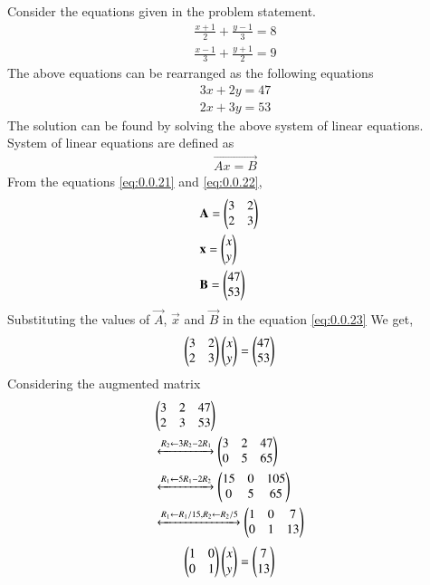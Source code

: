 \documentclass[journal,12pt,twocolumn]{IEEEtran}
\begin{document}
\solution Consider the equations given in the problem statement.
\begin{align}
\displaystyle\frac{x+1}{2}+\displaystyle\frac{y-1}{3}=8\\
\displaystyle\frac{x-1}{3}+\displaystyle\frac{y+1}{2}=9
\end{align}
The above equations can be rearranged as the following equations
\begin{align}
3x+2y=47 \label{eq:0.0.21}\\
2x+3y=53 \label{eq:0.0.22}
\end{align}
The solution can be found by solving the above system of linear equations.\\ 
System of linear equations are defined as 
\begin{align}
\vec{Ax=B} \label{eq:0.0.23}
\end{align}
From the equations \eqref{eq:0.0.21} and \eqref{eq:0.0.22}, 
\begin{align}
&\vec{A}= \myvec{3 &2\\2 & 3}&\\
\medskip
&\vec{x}= \myvec{ x\\ y}&\\
\medskip
&\vec{B}= \myvec{47\\53}&  
\end{align} 
Substituting the values of $\vec{A}$, $\vec{x}$ and $\vec{B}$ in the equation \eqref{eq:0.0.23}
We get,
\begin{align}
&\begin{pmatrix}3&2\\2&3\end{pmatrix} \begin{pmatrix}x\\y\end{pmatrix}= \begin{pmatrix}47\\53\end{pmatrix}&
\end{align}
Considering the augmented matrix 
 \begin{align}
& \begin{pmatrix}3&2&47\\2&3&53\end{pmatrix}&
 \\
&\xleftrightarrow[]{ R_2 \leftarrow 3R_2 - 2R_1}
 \begin{pmatrix}3&2&47\\0&5&65\end{pmatrix}&\\
 &\xleftrightarrow[]{ R_1 \leftarrow 5R_1 - 2R_2}
 \begin{pmatrix}15&0&105\\0&5&65\end{pmatrix}&\\
 &\xleftrightarrow[]{ R_1 \leftarrow R_1/15,R_2\leftarrow R_2/5}
 \begin{pmatrix}1&0&7\\0&1&13\end{pmatrix}&
 \end{align}
 \begin{align}
&\myvec{1&0\\0&1} \myvec{x\\y}= \myvec{7\\13}& \label{eq:0.0.32}
\medskip
\end{align}
\end{document}

